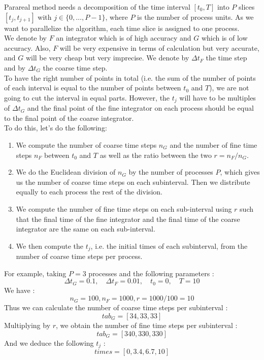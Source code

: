 \noindent Parareal method needs a decomposition of the time interval $[t_0,T]$ into $P$ slices $[t_j,t_{j+1}]$ with  $j\in\{0,\dots,P-1\}$, where $P$ is the number of process units. As we want to parallelize the algorithm, each time slice is assigned to one process. \\
We denote by $F$ an integrator which is of high accuracy and $G$ which is of low accuracy. Also, $F$ will be very expensive in terms of calculation but very accurate, and $G$ will be very cheap but very imprecise. We denote by $\Delta t_F$ the time step and by $\Delta t_G$ the coarse time step. \\
To have the right number of points in total (i.e. the sum of the number of points of each interval is equal to the number of points between $t_0$ and $T$), we are not going to cut the interval in equal parts. However, the $t_j$ will have to be multiples of $\Delta t_G$ and the final point of the fine integrator on each process should be equal to the final point of the coarse integrator. \\
To do this, let's do the following:
\begin{enumerate}[label=\textbullet]
	\item We compute the number of coarse time steps $n_G$ and the number of fine time steps $n_F$ between $t_0$ and $T$ as well as the ratio between the two $r=n_F/n_G$.
	\item We do the Euclidean division of $n_G$ by the number of processes $P$, which gives us the number of coarse time steps on each subinterval. Then we distribute equally to each process the rest of the division.
	\item We compute the number of fine time steps on each sub-interval using $r$ such that the final time of the fine integrator and the final time of the coarse integrator are the same on each sub-interval.
	\item We then compute the $t_j$, i.e. the initial times of each subinterval, from the number of coarse time steps per process.
\end{enumerate}
For example, taking $P=3$ processes and the following parameters :
$$\Delta t_G=0.1, \quad \Delta t_F=0.01, \quad t_0=0, \quad T=10$$ 
We have :
$$n_G=100, n_F=1000, r=1000/100=10$$
Thus we can calculate the number of coarse time steps per subinterval :
$$tab_G = [34,33,33]$$
Multiplying by $r$, we obtain the number of fine time steps per subinterval :
$$tab_G = [340,330,330]$$
And we deduce the following $t_j$ :
$$times = [0,3.4,6.7,10]$$

